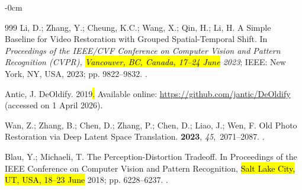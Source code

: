 \documentclass[symmetry,article,accept,pdftex,moreauthors]{Definitions/mdpi}
\begin{document}
\begin{adjustwidth}{-\extralength}{0cm}
\begin{thebibliography}{999}
Li, D.; Zhang, Y.; Cheung, K.C.; Wang, X.; Qin, H.; Li, H.
\newblock A Simple Baseline for Video Restoration with Grouped Spatial-Temporal
  Shift.
\newblock In \emph{Proceedings of the IEEE/CVF Conference on Computer Vision and
  Pattern Recognition (CVPR), \hl{Vancouver, BC, Canada, 17--24 June} 2023}; IEEE: New York, NY, USA,  2023; pp. 9822--9832.
.

Antic, J.
\newblock DeOldify. 2019\hl{.} %
\newblock  Available online: \url{https://github.com/jantic/DeOldify} (accessed on 1 April 2026).  


Wan, Z.; Zhang, B.; Chen, D.; Zhang, P.; Chen, D.; Liao, J.; Wen, F.
\newblock Old Photo Restoration via Deep Latent Space Translation.
  {\bf 2023}, {\em 45},~2071--2087.
.

Blau, Y.; Michaeli, T.
\newblock The Perception-Distortion Tradeoff.
\newblock In Proceedings of the IEEE Conference on Computer
  Vision and Pattern Recognition, \hl{Salt Lake City, UT, USA, 18--23 June} 2018; pp. 6228--6237.
.

\end{thebibliography}

\PublishersNote{}
\end{adjustwidth}
\end{document}
